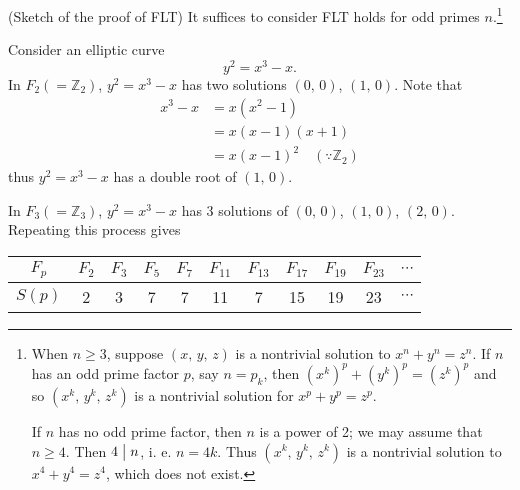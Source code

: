 (Sketch of the proof of FLT) It suffices to consider FLT holds for
odd primes $n$.\footnote{
    When $n \geq 3$, suppose $\left(x,\,y,\,z\right)$ is a nontrivial solution
    to $x^n+y^n=z^n$. If $n$ has an odd prime factor $p$, say $n=p_k$,
    then $\left(x^k\right)^p+\left(y^k\right)^p=\left(z^k\right)^p$ and so
    $\left(x^k,\,y^k,\,z^k\right)$ is a nontrivial solution for $x^p+y^p=z^p$.

    If $n$ has no odd prime factor, then $n$ is a power of 2; we may assume that $n \geq 4$.
    Then $4 \bigm| n$, i. e. $n=4k$. Thus $\left(x^k,\,y^k,\,z^k\right)$ is a
    nontrivial solution to $x^4+y^4=z^4$, which does not exist.
}

Consider an elliptic curve
\[
    y^2=x^3-x.
\]
In $F_2\left(=\mathbb{Z}_2\right)$, $y^2=x^3-x$ has two solutions $\left(0,\,0\right)$, $\left(1,\,0\right)$.
Note that
\begin{align*}
    x^3-x&=x\left(x^2-1\right)\\
    &=x\left(x-1\right)\left(x+1\right)\\
    &=x\left(x-1\right)^2 \quad \left(\because \mathbb{Z}_2\right)
\end{align*}
thus $y^2=x^3-x$ has a double root of $\left(1,\,0\right)$.

In $F_3\left(=\mathbb{Z}_3\right)$, $y^2=x^3-x$ has 3 solutions of $\left(0,\,0\right)$,
$\left(1,\,0\right)$, $\left(2,\,0\right)$.
Repeating this process gives

\begin{center}
    \begin{tabular}{c|cccccccccc}
        \hline
        $F_p$ & $F_2$ & $F_3$ & $F_5$ & $F_7$ & $F_{11}$ & $F_{13}$ & $F_{17}$ & $F_{19}$ & $F_{23}$ & $\cdots$ \\
        \hline
        $S\left(p\right)$ & 2 & 3 & 7 & 7 & 11 & 7 & 15 & 19 & 23 & $\cdots$ \\
        \hline
    \end{tabular}
\end{center}